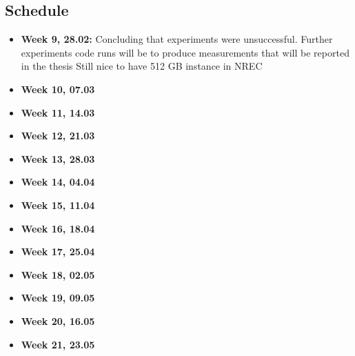 \subsection{Schedule}
\begin{itemize}
    \item \textbf{Week 9, 28.02:} Concluding that experiments were unsuccessful. 
        Further experiments code runs will be to produce measurements that will be reported in the thesis
        Still nice to have 512 GB instance in NREC
    \item \textbf{Week 10, 07.03}
    \item \textbf{Week 11, 14.03}
    \item \textbf{Week 12, 21.03}
    \item \textbf{Week 13, 28.03}
    \item \textbf{Week 14, 04.04}
    \item \textbf{Week 15, 11.04}
    \item \textbf{Week 16, 18.04}
    \item \textbf{Week 17, 25.04}
    \item \textbf{Week 18, 02.05}
    \item \textbf{Week 19, 09.05}
    \item \textbf{Week 20, 16.05}
    \item \textbf{Week 21, 23.05}
\end{itemize}
%
%
%
%
%
%

